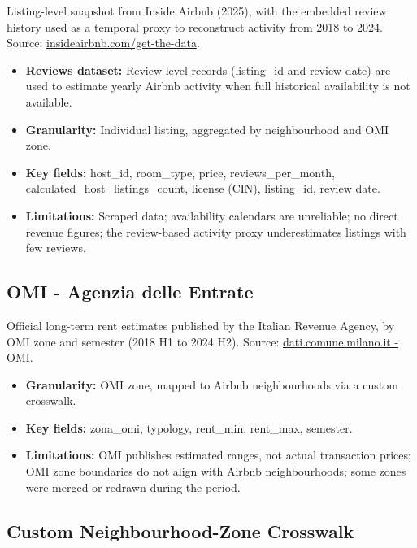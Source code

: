 \documentclass[11pt, a4paper]{article}
\begin{document}
Listing-level snapshot from Inside Airbnb (2025), with the embedded review history used as a
temporal proxy to reconstruct activity from 2018 to 2024.
Source: \href{https://insideairbnb.com/get-the-data/}{insideairbnb.com/get-the-data}.

\begin{itemize}[leftmargin=1.4em]
  \item \textbf{Reviews dataset:} Review-level records (listing\_id and review date) are used
        to estimate yearly Airbnb activity when full historical availability is not available.
  \item \textbf{Granularity:} Individual listing, aggregated by neighbourhood and OMI zone.
  \item \textbf{Key fields:} host\_id, room\_type, price, reviews\_per\_month,
        calculated\_host\_listings\_count, license (CIN), listing\_id, review date.
  \item \textbf{Limitations:} Scraped data; availability calendars are unreliable; no direct
        revenue figures; the review-based activity proxy underestimates listings with few reviews.
\end{itemize}

\subsection{OMI - Agenzia delle Entrate}

Official long-term rent estimates published by the Italian Revenue Agency, by OMI zone and
semester (2018 H1 to 2024 H2).
Source: \href{https://dati.comune.milano.it/dataset?tags=OMI}{dati.comune.milano.it - OMI}.

\begin{itemize}[leftmargin=1.4em]
  \item \textbf{Granularity:} OMI zone, mapped to Airbnb neighbourhoods via a custom crosswalk.
  \item \textbf{Key fields:} zona\_omi, typology, rent\_min, rent\_max, semester.
  \item \textbf{Limitations:} OMI publishes estimated ranges, not actual transaction prices;
        OMI zone boundaries do not align with Airbnb neighbourhoods; some zones were merged or
        redrawn during the period.
\end{itemize}

\subsection{Custom Neighbourhood-Zone Crosswalk}
\end{document}
